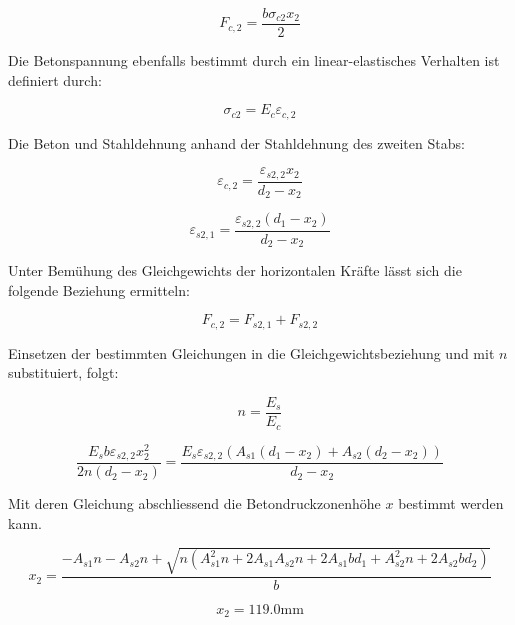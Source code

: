 \documentclass[
  12pt,
  letterpaper,
  egregdoesnotlikesansseriftitles]{scrreprt}
\begin{document}
\begin{equation}F_{c,2} = \frac{b \sigma_{c 2} x_{2}}{2}\end{equation}

Die Betonspannung ebenfalls bestimmt durch ein linear-elastisches
Verhalten ist definiert durch:

\begin{equation}\sigma_{c 2} = E_{c} \varepsilon_{c,2}\end{equation}

Die Beton und Stahldehnung anhand der Stahldehnung des zweiten Stabs:

\begin{equation}\varepsilon_{c,2} = \frac{\varepsilon_{s2,2} x_{2}}{d_{2} - x_{2}}\end{equation}

\begin{equation}\varepsilon_{s2,1} = \frac{\varepsilon_{s2,2} \left(d_{1} - x_{2}\right)}{d_{2} - x_{2}}\end{equation}

Unter Bemühung des Gleichgewichts der horizontalen Kräfte lässt sich die
folgende Beziehung ermitteln:

\begin{equation}F_{c,2} = F_{s2,1} + F_{s2,2}\end{equation}

Einsetzen der bestimmten Gleichungen in die Gleichgewichtsbeziehung und
mit \(n\) substituiert, folgt:

\begin{equation}n = \frac{E_{s}}{E_{c}}\end{equation}

\begin{equation}\frac{E_{s} b \varepsilon_{s2,2} x_{2}^{2}}{2 n \left(d_{2} - x_{2}\right)} = \frac{E_{s} \varepsilon_{s2,2} \left(A_{s 1} \left(d_{1} - x_{2}\right) + A_{s 2} \left(d_{2} - x_{2}\right)\right)}{d_{2} - x_{2}}\end{equation}

Mit deren Gleichung abschliessend die Betondruckzonenhöhe \(x\) bestimmt
werden kann.

\begin{equation}x_{2} = \frac{- A_{s 1} n - A_{s 2} n + \sqrt{n \left(A_{s 1}^{2} n + 2 A_{s 1} A_{s 2} n + 2 A_{s 1} b d_{1} + A_{s 2}^{2} n + 2 A_{s 2} b d_{2}\right)}}{b}\end{equation}

\begin{equation}x_{2} = 119.0 \text{mm}\end{equation}
\end{document}
